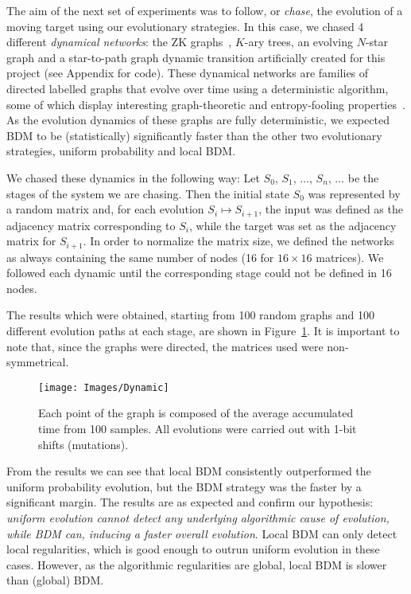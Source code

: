 \documentclass[10pt]{article}
\begin{document}
The aim of the next set of experiments was to follow, or \textit{chase}, the evolution of a moving target using our evolutionary strategies. In this case, we chased 4 different \textit{dynamical networks}: the ZK graphs~\cite{zenil2017low}, $K$-ary trees, an evolving $N$-star graph and a star-to-path graph dynamic transition artificially created for this project (see Appendix for code). These dynamical networks are families of directed labelled graphs that evolve over time using a deterministic algorithm, some of which display interesting graph-theoretic and entropy-fooling properties~\cite{zenil2017low}. As the evolution dynamics of these graphs are fully deterministic, we expected BDM to be (statistically) significantly faster than the other two evolutionary strategies, uniform probability and local BDM.

We chased these dynamics in the following way: Let $S_0$, $S_1$, $\ldots$, $S_n$, $\ldots$ be the stages of the system we are chasing. Then the initial state $S_0$ was represented by a random matrix and, for each evolution $S_i \mapsto S_{i+1}$, the input was defined as the adjacency matrix corresponding to $S_i$, while the target was set as the adjacency matrix for $S_{i+1}$. In order to normalize the matrix size, we defined the networks as always containing the same number of nodes (16 for $16 \times 16$ matrices). We followed each dynamic until the corresponding stage could not be defined in 16 nodes.

The results which were obtained, starting from 100 random graphs and 100 different evolution paths at each stage, are shown in Figure~\ref{dynamicG}. It is important to note that, since the graphs were directed, the matrices used were non-symmetrical.


\begin{figure}[ht!]
    \centering
    \texttt{[image: Images/Dynamic]}
    \caption{Each point of the graph is composed of the average accumulated time from 100 samples. All evolutions were carried
    out with 1-bit shifts (mutations).
        \label{dynamicG}}
\end{figure}

From the results we can see that local BDM consistently outperformed the uniform probability evolution, but the BDM strategy was the faster by a significant margin. The results are as expected and confirm our hypothesis: \textit{uniform evolution cannot detect any underlying algorithmic cause of evolution, while BDM can, inducing a faster overall evolution}. Local BDM can only detect local regularities, which is good enough to outrun uniform evolution in these cases. However, as the algorithmic regularities are global, local BDM is slower than (global) BDM.
\end{document}
